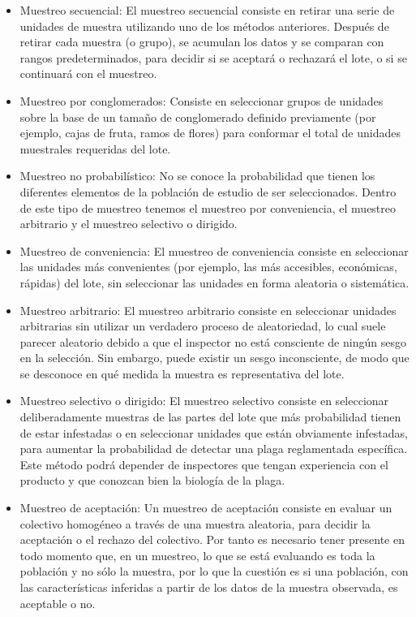 \begin{itemize}
\item Muestreo secuencial: El muestreo secuencial consiste en retirar una serie de unidades de muestra utilizando uno de los m\'{e}todos anteriores. Despu\'{e}s de retirar cada muestra (o grupo), se acumulan los datos y se comparan con rangos predeterminados, para decidir si se aceptar\'{a} o rechazar\'{a} el lote, o si se continuar\'{a} con el muestreo.\cite{MUES}
\item Muestreo por conglomerados: Consiste en seleccionar grupos de unidades sobre la base de un tama\~{n}o de conglomerado definido previamente (por ejemplo, cajas de fruta, ramos de flores) para conformar el total de unidades muestrales requeridas del lote.\cite{MUES}
\item Muestreo no probabil\'{i}stico: No se conoce la probabilidad que tienen los diferentes elementos de la poblaci\'{o}n de estudio de ser seleccionados. Dentro de este tipo de muestreo tenemos el muestreo por conveniencia, el muestreo arbitrario y el muestreo selectivo o dirigido.
\item Muestreo de conveniencia: El muestreo de conveniencia consiste en seleccionar las unidades m\'{a}s convenientes (por ejemplo, las m\'{a}s accesibles,
econ\'{o}micas, r\'{a}pidas) del lote, sin seleccionar las unidades en forma aleatoria o sistem\'{a}tica.\cite{MUES}
\item Muestreo arbitrario: El muestreo arbitrario consiste en seleccionar unidades arbitrarias sin utilizar un verdadero proceso de aleatoriedad, lo
cual suele parecer aleatorio debido a que el inspector no est\'{a} consciente de ning\'{u}n sesgo en la selecci\'{o}n. Sin embargo,
puede existir un sesgo inconsciente, de modo que se desconoce en qu\'{e} medida la muestra es representativa del lote.\cite{MUES}
\item Muestreo selectivo o dirigido: El muestreo selectivo consiste en seleccionar deliberadamente muestras de las partes del lote que m\'{a}s probabilidad
tienen de estar infestadas o en seleccionar unidades que est\'{a}n obviamente infestadas, para aumentar la probabilidad de
detectar una plaga reglamentada espec\'{i}fica. Este m\'{e}todo podr\'{a} depender de inspectores que tengan experiencia con el
producto y que conozcan bien la biolog\'{i}a de la plaga.\cite{MUES}
\item Muestreo de aceptaci\'{o}n: Un muestreo de aceptaci\'{o}n consiste en evaluar un colectivo homog\'{e}neo a trav\'{e}s de una muestra aleatoria, para decidir la aceptaci\'{o}n o el rechazo del colectivo. Por tanto es necesario tener presente en todo momento que, en un muestreo, lo que se est\'{a} evaluando es toda la poblaci\'{o}n y no s\'{o}lo la muestra, por lo que la cuesti\'{o}n es si una poblaci\'{o}n, con las caracter\'{i}sticas inferidas a partir de los datos de la muestra observada, es aceptable o no.\cite{ACEP}

\end{itemize}
